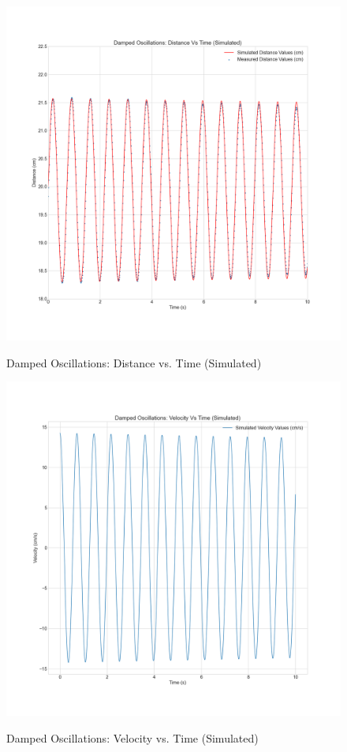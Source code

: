 \documentclass[letterpaper,12pt]{article}
\begin{document}
\begin{figure}[H]
  \centering
  \includegraphics[width=0.95\linewidth]{../Pankaj/lab3_damped_sim_distance_vs_time.png}    
  \begin{center}
    \emph{}
  \end{center}
  \caption{Damped Oscillations: Distance vs. Time (Simulated)}
  \label{damped-sim-d-t-plot}
\end{figure}

\begin{figure}[H]
  \centering
  \includegraphics[width=0.95\linewidth]{../Pankaj/lab3_damped_sim_velocity_vs_time.png}    
  \begin{center}
    \emph{}
  \end{center}
  \caption{Damped Oscillations: Velocity vs. Time (Simulated)}
  \label{damped-sim-v-t-plot}
\end{figure}
\end{document}
